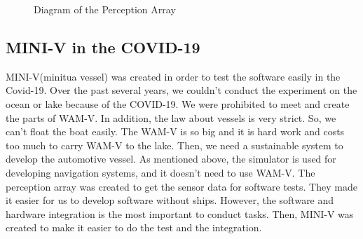 \documentclass[lettersize,journal]{IEEEtran}
\begin{document}
\begin{figure}[H]
  \begin{center}
  \end{center}
  \caption{Diagram of the Perception Array}
  \label{fig:perception_aray_diagram}
\end{figure}


\subsection{MINI-V in the COVID-19}
MINI-V(minitua vessel) was created in order to test the software easily in the Covid-19. Over the past several years, 
we couldn't conduct the experiment on the ocean or lake because of the COVID-19.
We were prohibited to meet and create the parts of WAM-V.
In addition, the law about vessels is very strict.
So, we can't float the boat easily. The WAM-V is so big and it is hard work and costs too much to carry WAM-V to the lake. 
Then, we need a sustainable system to develop the automotive vessel.
As mentioned above, the simulator is used for developing navigation systems, and it doesn't need to use WAM-V.
The perception array was created to get the sensor data for software tests. They made it easier for us to develop software without ships.
However, the software and hardware integration is the most important to conduct tasks. Then, MINI-V was created 
to make it easier to do the test and the integration.
\end{document}
